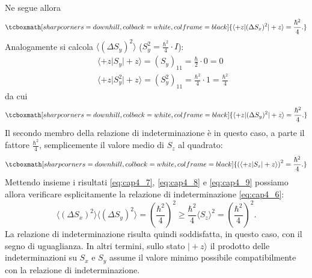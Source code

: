 \documentclass[a4paper,12pt,oneside]{book}
\begin{document}
Ne segue allora
	\begin{equation}
		\label{eq:cap4_7}
		\tcboxmath[sharp corners=downhill, colback=white, colframe=black]{
			\langle +z \vert (\Delta S_x)^2\vert +z \rangle = \frac{\hbar ^2}{4}.
			}
	\end{equation}
Analogamente si calcola $\langle (\Delta S_y)^2 \rangle $ ($S_y ^2= \frac{\hbar ^2}{4}\cdot I$):
	\begin{eqnarray}
	& &\displaystyle{\langle +z \vert S_y \vert +z \rangle = (S_y)_{11} = \frac{\hbar}{2}\cdot 0 =0}  \\
	& &\displaystyle{\langle +z \vert S_y ^2\vert +z \rangle = (S_y ^2)_{11} = \frac{\hbar ^2}{4}\cdot 1 =\frac{\hbar ^2}{4}} \nonumber
	\end{eqnarray}
da cui
	\begin{equation}
		\label{eq:cap4_8}
		\tcboxmath[sharp corners=downhill, colback=white, colframe=black]{
			\langle +z \vert (\Delta S_y)^2\vert +z \rangle = \frac{\hbar ^2}{4}.
			}
	\end{equation}
Il secondo membro della relazione di indeterminazione è in questo caso, a parte il fattore $\frac{\hbar ^2}{4}$, semplicemente il valore medio di $S_z$ al quadrato:
	\begin{equation}
		\label{eq:cap4_9}
		\tcboxmath[sharp corners=downhill, colback=white, colframe=black]{
			\left( \langle +z \vert S_z \vert +z \rangle \right) ^2 = \frac{\hbar ^2}{4}.
			}
	\end{equation}
Mettendo insieme i risultati \eqref{eq:cap4_7}, \eqref{eq:cap4_8} e \eqref{eq:cap4_9} possiamo allora verificare esplicitamente la relazione di indeterminazione \eqref{eq:cap4_6}:
	\begin{equation}
		\langle  (\Delta S_x)^2 \rangle \langle(\Delta S_y)^2 \rangle = \left(\frac{\hbar ^2}{4} \right) ^2 \geq \frac{\hbar ^2}{4} \langle S_z  \rangle ^2 = \left(\frac{\hbar ^2}{4} \right) ^2.
	\end{equation}
La relazione di indeterminazione risulta quindi soddisfatta, in questo caso, con il segno di uguaglianza. In altri termini, sullo stato $\vert +z \rangle $ il prodotto delle indeterminazioni su $S_x$ e $S_y$ assume il valore minimo possibile compatibilmente con la relazione di indeterminazione.\\ \\
\end{document}
